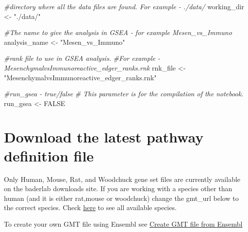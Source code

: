 \documentclass[
]{book}
\newenvironment{Shaded}{\begin{snugshade}}{\end{snugshade}}
\newcommand{\CommentTok}[1]{\textcolor[rgb]{0.56,0.35,0.01}{\textit{#1}}}
\newcommand{\ConstantTok}[1]{\textcolor[rgb]{0.00,0.00,0.00}{#1}}
\newcommand{\NormalTok}[1]{#1}
\newcommand{\OtherTok}[1]{\textcolor[rgb]{0.56,0.35,0.01}{#1}}
\newcommand{\StringTok}[1]{\textcolor[rgb]{0.31,0.60,0.02}{#1}}
\begin{document}
\begin{Shaded}
\begin{Highlighting}[]
\CommentTok{\#directory where all the data files are found.  For example {-}   ./data/ }
\NormalTok{working\_dir }\OtherTok{\textless{}{-}} \StringTok{"./data/"}

\CommentTok{\#The name to give the analysis in GSEA {-} for example Mesen\_vs\_Immuno}
\NormalTok{analysis\_name }\OtherTok{\textless{}{-}} \StringTok{"Mesen\_vs\_Immuno"}

\CommentTok{\#rank file to use in GSEA analysis.  }
\CommentTok{\#For example {-} MesenchymalvsImmunoreactive\_edger\_ranks.rnk}
\NormalTok{rnk\_file }\OtherTok{\textless{}{-}} \StringTok{"MesenchymalvsImmunoreactive\_edger\_ranks.rnk"}

\CommentTok{\#run\_gsea {-} true/false}
\CommentTok{\# This parameter is for the compilation of the notebook.  }
\NormalTok{run\_gsea }\OtherTok{\textless{}{-}} \ConstantTok{FALSE}
\end{Highlighting}
\end{Shaded}

\hypertarget{download-the-latest-pathway-definition-file}{%
\section{Download the latest pathway definition file}\label{download-the-latest-pathway-definition-file}}

Only Human, Mouse, Rat, and Woodchuck gene set files are currently available on the baderlab downloads site. If you are working with a species other than human (and it is either rat,mouse or woodchuck) change the gmt\_url below to the correct species. Check \href{http://download.baderlab.org/EM_Genesets/current_release/}{here} to see all available species.

To create your own GMT file using Ensembl see \protect\hyperlink{create-gmt-file-from-ensembl}{Create GMT file from Ensembl}
\end{document}
